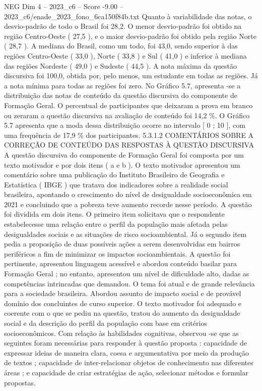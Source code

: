 \begin{textsample}{NEG Dim 4 – 2023\_c6 – Score -9.00 – 2023\_c6/enade\_2023\_fono\_6ca150f84b.txt}
Quanto à variabilidade das notas, o desvio-padrão de todo o Brasil foi 28,2.
O menor desvio-padrão foi obtido na região Centro-Oeste ( 27,5 ), e o maior desvio-padrão foi obtido pela região Norte ( 28,7 ).
A mediana do Brasil, como um todo, foi 43,0, sendo superior à das regiões Centro-Oeste ( 33,0 ), Norte ( 33,8 ) e Sul ( 41,0 ) e inferior à mediana das regiões Nordeste ( 49,0 ) e Sudeste ( 44,5 ).
A nota máxima da questão discursiva foi 100,0, obtida por, pelo menos, um estudante em todas as regiões.
Já a nota mínima para todas as regiões foi zero.
No Gráfico 5.7, apresenta -se a distribuição das notas de conteúdo da questão discursiva do componente de Formação Geral.
O percentual de participantes que deixaram a prova em branco ou zeraram a questão discursiva na avaliação de conteúdo foi 14,2 \%.
O Gráfico 5.7 apresenta que a moda dessa distribuição ocorre no intervalo [ 0 ; 10 ], com uma frequência de 17,9 \% dos participantes. 5.3.1.2 COMENTÁRIOS SOBRE A CORREÇÃO DE CONTEÚDO DAS RESPOSTAS À QUESTÃO DISCURSIVA A questão discursiva do componente de Formação Geral foi composta por um texto motivador e por dois itens ( a e b ).
O texto motivador apresentou um comentário sobre uma publicação do Instituto Brasileiro de Geografia e Estatística ( IBGE ) que tratava dos indicadores sobre a realidade social brasileira, apontando o crescimento do nível de desigualdade socioeconômica em 2021 e concluindo que a pobreza teve aumento recorde nesse período.
A questão foi dividida em dois itens.
O primeiro item solicitava que o respondente estabelecesse uma relação entre o perfil da população mais afetada pelas desigualdades sociais e as situações de risco socioambiental.
Já o segundo item pedia a proposição de duas possíveis ações a serem desenvolvidas em bairros periféricos a fim de minimizar os impactos socioambientais.
A questão foi pertinente, apresentou linguagem acessível e abordou conteúdo basilar para Formação Geral ; no entanto, apresentou um nível de dificuldade alto, dadas as competências intrincadas que demandou.
O tema foi atual e de grande relevância para a sociedade brasileira.
Abordou assunto de impacto social e de provável domínio dos concluintes de curso superior.
O texto motivador foi adequado e coerente com o que se pediu na questão, tratou do aumento da desigualdade social e da descrição do perfil da população com base em critérios socioeconômicos.
Com relação às habilidades cognitivas, observou -se que as seguintes foram necessárias para responder à questão proposta : capacidade de expressar ideias de maneira clara, coesa e argumentativa por meio da produção de textos ; capacidade de inter-relacionar objetos de conhecimento nas diferentes áreas ; e capacidade de criar estratégias de ação, selecionar métodos e formular propostas.

\end{textsample}
